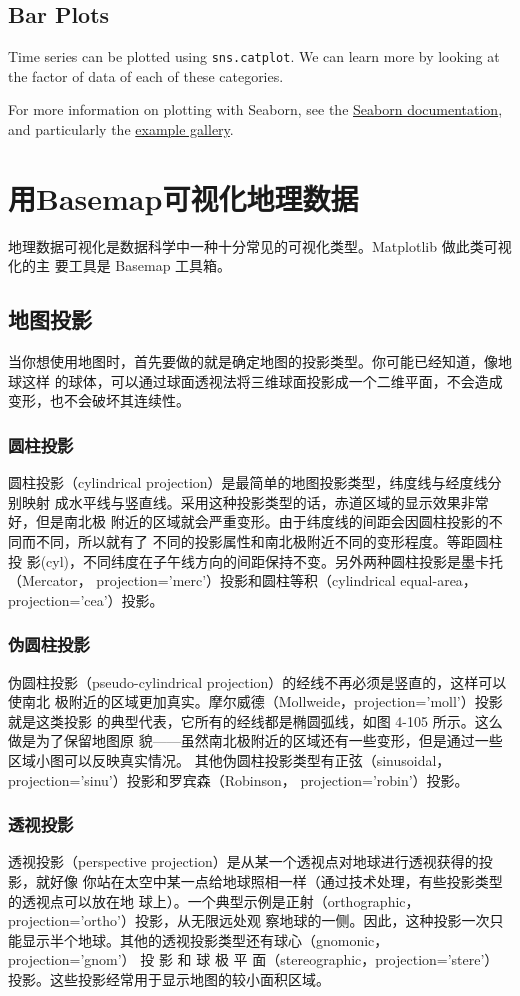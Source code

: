 \subsection*{Bar Plots}
Time series can be plotted using \verb|sns.catplot|. We can learn more by looking at the factor of data of each of these categories.

For more information on plotting with Seaborn, see the \href{http://seaborn.pydata.org/}{Seaborn documentation}, and
particularly the \href{https://seaborn.pydata.org/examples/index.html}{example gallery}.

\section{用Basemap可视化地理数据}
地理数据可视化是数据科学中一种十分常见的可视化类型。Matplotlib 做此类可视化的主
要工具是 Basemap 工具箱。

\subsection{地图投影}
当你想使用地图时，首先要做的就是确定地图的投影类型。你可能已经知道，像地球这样
的球体，可以通过球面透视法将三维球面投影成一个二维平面，不会造成变形，也不会破坏其连续性。

\subsubsection*{圆柱投影}
圆柱投影（cylindrical projection）是最简单的地图投影类型，纬度线与经度线分别映射
成水平线与竖直线。采用这种投影类型的话，赤道区域的显示效果非常好，但是南北极
附近的区域就会严重变形。由于纬度线的间距会因圆柱投影的不同而不同，所以就有了
不同的投影属性和南北极附近不同的变形程度。等距圆柱投
影(cyl)，不同纬度在子午线方向的间距保持不变。另外两种圆柱投影是墨卡托（Mercator，
projection='merc'）投影和圆柱等积（cylindrical equal-area，projection='cea'）投影。
\subsubsection*{伪圆柱投影}
伪圆柱投影（pseudo-cylindrical projection）的经线不再必须是竖直的，这样可以使南北
极附近的区域更加真实。摩尔威德（Mollweide，projection='moll'）投影就是这类投影
的典型代表，它所有的经线都是椭圆弧线，如图 4-105 所示。这么做是为了保留地图原
貌——虽然南北极附近的区域还有一些变形，但是通过一些区域小图可以反映真实情况。
其他伪圆柱投影类型有正弦（sinusoidal，projection='sinu'）投影和罗宾森（Robinson，
projection='robin'）投影。
\subsubsection*{透视投影}
透视投影（perspective projection）是从某一个透视点对地球进行透视获得的投影，就好像
你站在太空中某一点给地球照相一样（通过技术处理，有些投影类型的透视点可以放在地
球上）。一个典型示例是正射（orthographic，projection='ortho'）投影，从无限远处观
察地球的一侧。因此，这种投影一次只能显示半个地球。其他的透视投影类型还有球心（gnomonic，projection='gnom'） 投 影 和 球 极 平 面（stereographic，projection='stere'）
投影。这些投影经常用于显示地图的较小面积区域。

